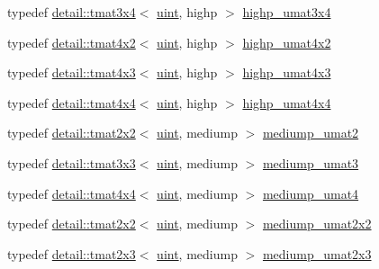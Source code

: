 \begin{DoxyCompactItemize}
\item 
typedef \hyperlink{structglm_1_1detail_1_1tmat3x4}{detail\+::tmat3x4}$<$ \hyperlink{group__core__precision_ga4fd29415871152bfb5abd588334147c8}{uint}, highp $>$ \hyperlink{group__gtc__matrix__integer_gabaeb2363acd07cc7f99918bae48ccc05}{highp\+\_\+umat3x4}
\item 
typedef \hyperlink{structglm_1_1detail_1_1tmat4x2}{detail\+::tmat4x2}$<$ \hyperlink{group__core__precision_ga4fd29415871152bfb5abd588334147c8}{uint}, highp $>$ \hyperlink{group__gtc__matrix__integer_ga32442efcb778cb80024a17bafa781f81}{highp\+\_\+umat4x2}
\item 
typedef \hyperlink{structglm_1_1detail_1_1tmat4x3}{detail\+::tmat4x3}$<$ \hyperlink{group__core__precision_ga4fd29415871152bfb5abd588334147c8}{uint}, highp $>$ \hyperlink{group__gtc__matrix__integer_ga763a36c57b6073ca3cac739bfbe794ba}{highp\+\_\+umat4x3}
\item 
typedef \hyperlink{structglm_1_1detail_1_1tmat4x4}{detail\+::tmat4x4}$<$ \hyperlink{group__core__precision_ga4fd29415871152bfb5abd588334147c8}{uint}, highp $>$ \hyperlink{group__gtc__matrix__integer_gaa14b7029cfaf6f26384782f5ff7acddf}{highp\+\_\+umat4x4}
\item 
typedef \hyperlink{structglm_1_1detail_1_1tmat2x2}{detail\+::tmat2x2}$<$ \hyperlink{group__core__precision_ga4fd29415871152bfb5abd588334147c8}{uint}, mediump $>$ \hyperlink{group__gtc__matrix__integer_ga388a5b9d7e494d5f5bd30b9e11ded06a}{mediump\+\_\+umat2}
\item 
typedef \hyperlink{structglm_1_1detail_1_1tmat3x3}{detail\+::tmat3x3}$<$ \hyperlink{group__core__precision_ga4fd29415871152bfb5abd588334147c8}{uint}, mediump $>$ \hyperlink{group__gtc__matrix__integer_ga123f7d8bac8849e3a150bdf8a21e44a2}{mediump\+\_\+umat3}
\item 
typedef \hyperlink{structglm_1_1detail_1_1tmat4x4}{detail\+::tmat4x4}$<$ \hyperlink{group__core__precision_ga4fd29415871152bfb5abd588334147c8}{uint}, mediump $>$ \hyperlink{group__gtc__matrix__integer_gac82f1c426fbca1c4989f0985eb7a4358}{mediump\+\_\+umat4}
\item 
typedef \hyperlink{structglm_1_1detail_1_1tmat2x2}{detail\+::tmat2x2}$<$ \hyperlink{group__core__precision_ga4fd29415871152bfb5abd588334147c8}{uint}, mediump $>$ \hyperlink{group__gtc__matrix__integer_ga80e478f09c6caa16410198ce78fe8a2b}{mediump\+\_\+umat2x2}
\item 
typedef \hyperlink{structglm_1_1detail_1_1tmat2x3}{detail\+::tmat2x3}$<$ \hyperlink{group__core__precision_ga4fd29415871152bfb5abd588334147c8}{uint}, mediump $>$ \hyperlink{group__gtc__matrix__integer_gaaae45c5dbaad1ecd57bfa936d851be1b}{mediump\+\_\+umat2x3}

\end{DoxyCompactItemize}
